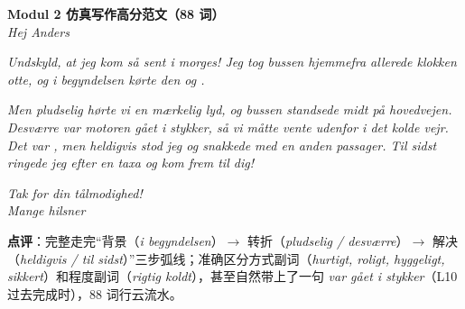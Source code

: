 \begin{answerbox}
\textbf{Modul 2 仿真写作高分范文（88 词）}\\
\textit{Hej Anders}

\textit{Undskyld, at jeg kom så sent i morges! Jeg tog bussen hjemmefra allerede klokken otte, og i begyndelsen kørte den  og .}

\textit{Men pludselig hørte vi en mærkelig lyd, og bussen standsede midt på hovedvejen. Desværre var motoren gået i stykker, så vi måtte vente udenfor i det kolde vejr. Det var , men heldigvis stod jeg og snakkede  med en anden passager. Til sidst ringede jeg efter en taxa og kom  frem til dig!}

\textit{Tak for din tålmodighed!\\
Mange hilsner\\
}

\small\textbf{点评}：完整走完“背景（\textit{i begyndelsen}）$\rightarrow$ 转折（\textit{pludselig / desværre}）$\rightarrow$ 解决（\textit{heldigvis / til sidst}）”三步弧线；准确区分方式副词（\textit{hurtigt, roligt, hyggeligt, sikkert}）和程度副词（\textit{rigtig koldt}），甚至自然带上了一句 \textit{var gået i stykker}（L10 过去完成时），88 词行云流水。
\end{answerbox}

